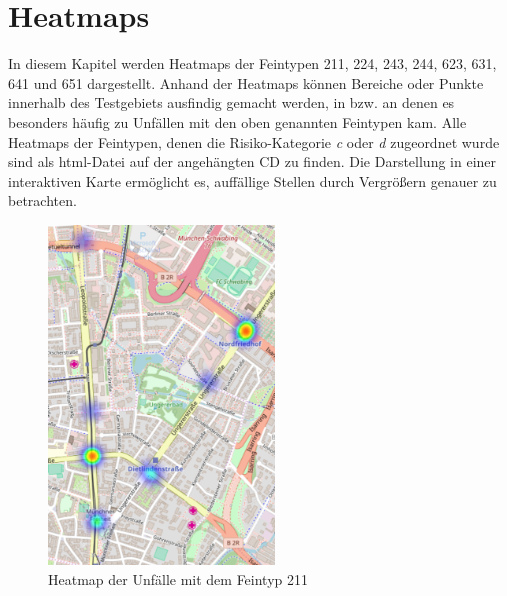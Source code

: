 
\chapter{Heatmaps}\label{chapter:Heatmaps}

In diesem Kapitel werden Heatmaps der Feintypen 211, 224, 243, 244, 623, 631, 641 und 651 dargestellt. Anhand der Heatmaps können Bereiche oder Punkte innerhalb des Testgebiets ausfindig gemacht werden, in bzw. an denen es besonders häufig zu Unfällen mit den oben genannten Feintypen kam. Alle Heatmaps der Feintypen, denen die Risiko-Kategorie \textit{c} oder \textit{d} zugeordnet wurde sind als html-Datei auf der angehängten CD zu finden. Die Darstellung in einer interaktiven Karte ermöglicht es, auffällige Stellen durch Vergrößern genauer zu betrachten.

\begin{savenotes}
	\begin{figure}[H]
		\centering
		\includegraphics[width=6cm,height=9cm]{figures/HM_211}
		\caption[Heatmap der Unfälle mit dem Feintyp 211]{Heatmap der Unfälle mit dem Feintyp 211}\label{fig:Heatmap_211}
	\end{figure}
\end{savenotes}

